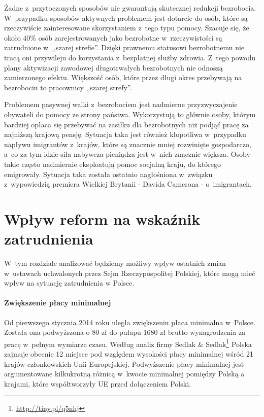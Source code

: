 \documentclass[12pt]{article}
\begin{document}
   Żadne z~przytoczonych sposobów nie gwarantują skutecznej redukcji bezrobocia. W~przypadku sposobów aktywnych problemem jest dotarcie do osób, które są rzeczywiście zainteresowane skorzystaniem z~tego typu pomocy. Szacuje się, że około 40\% osób zarejestrowanych jako bezrobotne w~rzeczywistości są zatrudnione w~,,szarej strefie''. Dzięki prawnemu statusowi bezrobotnemu nie tracą oni przywileju do korzystania z~bezpłatnej służby zdrowia. Z~tego powodu plany aktywizacji zawodowej długotrwałych bezrobotnych nie odnoszą zamierzonego efektu. Większość osób, które przez długi okres przebywają na bezrobociu to pracownicy ,,szarej strefy''.
   
   Problemem pasywnej walki z~bezrobociem jest nadmierne przyzwyczajenie obywateli do pomocy ze strony państwa. Wykorzystują to głównie osoby, którym bardziej opłaca się przebywać na zasiłku dla bezrobotnych niż podjąć pracę za najniższą krajową pensję. Sytuacja taka jest również kłopotliwa w~przypadku napływu imigrantów z~krajów, które są znacznie mniej rozwinięte gospodarczo, a~co za tym idzie siła nabywcza pieniądza jest w~nich znacznie większa. Osoby takie często nadmiernie eksploatują pomoc socjalną kraju, do którego emigrowały. Sytuacja taka została ostatnio nagłośniona w~związku z~wypowiedzią premiera Wielkiej Brytanii - Davida Camerona - o~imigrantach.
    
    \section*{Wpływ reform na wskaźnik zatrudnienia}
    
    W~tym rozdziale analizować będziemy możliwy wpływ ostatnich zmian w~ustawach uchwalonych przez Sejm Rzeczypospolitej Polskiej, które mogą mieć wpływ na sytuację zatrudnienia w Polsce.
        
    \paragraph{Zwiększenie płacy minimalnej} 
    
    Od pierwszego stycznia 2014 roku uległa zwiększeniu płaca minimalna w~Polsce. Została ona podwyższona o 80 zł do pułapu 1680 zł brutto wynagrodzenia za pracę w~pełnym wymiarze czasu. Według analiz firmy Sedlak \& Sedlak\footnote{\url{http://tiny.pl/q5nhj}} Polska zajmuje obecnie 12 miejsce pod względem wysokości płacy minimalnej wśród 21 krajów członkowskich Unii Europejskiej. Podwyższenie płacy minimalnej jest argumentowane kilkukrotną różnicą w~kwocie minimalnej pomiędzy Polską a krajami, które współtworzyły UE przed dołączeniem Polski. 
    
\end{document}
